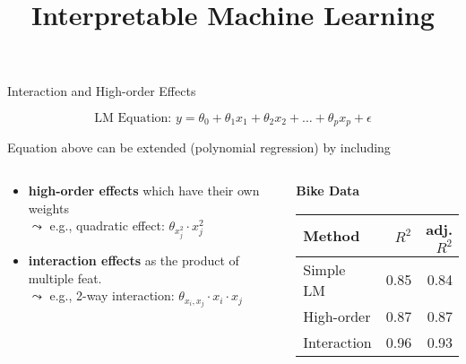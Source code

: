 \documentclass[11pt,compress,t,notes=noshow, aspectratio=169, xcolor=table]{beamer}
\title{Interpretable Machine Learning}
\date{}
\begin{document}
\newcommand{\titlefigure}{figure/l1_hat}
\newcommand{\learninggoals}{
\item Inclusion of high-order and interaction effects
\item Regularization via LASSO
}


\begin{frame}{Interaction and High-order Effects}

$$\text{LM Equation: } y = \theta_0 + \theta_1 x_1 + \theta_2 x_2 + \dots + \theta_p x_p + \epsilon$$

Equation above can be extended (polynomial regression) by including

\begin{columns}[T, totalwidth=\textwidth]
\begin{column}{0.65\linewidth}
    \begin{itemize}
        \item \textbf{high-order effects} which have their own weights\\
        $\leadsto$ e.g., quadratic effect: $\theta_{x_j^2} \cdot x_j^2$
        \item \textbf{interaction effects} as the product of multiple feat.\\
        $\leadsto$ e.g., 2-way interaction: $\theta_{x_i, x_j} \cdot x_i \cdot x_j$
    \end{itemize}
\end{column}
\begin{column}{0.34\linewidth}
    \vspace{-0.2cm}
    \centering
    \begin{scriptsize}
    \begin{table}[ht]
    \textbf{Bike Data}
        \begin{tabular}{lrr}
        \hline
        Method & $R^2$ & adj. $R^2$ \\ 
        \hline
        Simple LM & 0.85 & 0.84 \\ 
        High-order & 0.87 & 0.87 \\ 
        Interaction  & 0.96 & 0.93 \\ 
        \hline
        \end{tabular}
    \end{table}
    \end{scriptsize}
\end{column}
\end{columns}


\end{frame}
\end{document}
